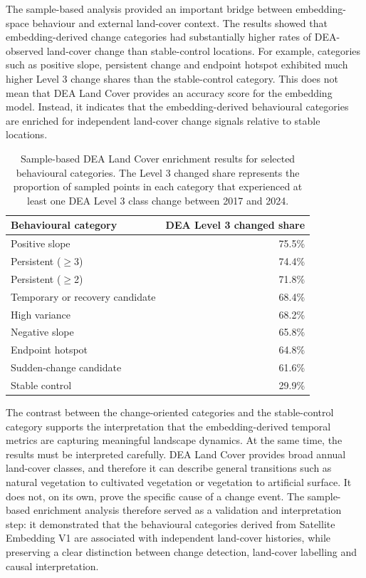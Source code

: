 \documentclass[11pt,a4paper]{article}
\begin{document}
The sample-based analysis provided an important bridge between embedding-space behaviour and external land-cover context. The results showed that embedding-derived change categories had substantially higher rates of DEA-observed land-cover change than stable-control locations. For example, categories such as positive slope, persistent change and endpoint hotspot exhibited much higher Level 3 change shares than the stable-control category. This does not mean that DEA Land Cover provides an accuracy score for the embedding model. Instead, it indicates that the embedding-derived behavioural categories are enriched for independent land-cover change signals relative to stable locations.

\begin{table}[H]
\centering
\caption{Sample-based DEA Land Cover enrichment results for selected behavioural categories. The Level 3 changed share represents the proportion of sampled points in each category that experienced at least one DEA Level 3 class change between 2017 and 2024.}
\label{tab:dea_sample_enrichment}
\renewcommand{\arraystretch}{1.2}
\begin{tabularx}{0.85\textwidth}{>{\raggedright\arraybackslash}X r}
\toprule
\textbf{Behavioural category} & \textbf{DEA Level 3 changed share} \\
\midrule
Positive slope & 75.5\% \\
Persistent ($\geq$3) & 74.4\% \\
Persistent ($\geq$2) & 71.8\% \\
Temporary or recovery candidate & 68.4\% \\
High variance & 68.2\% \\
Negative slope & 65.8\% \\
Endpoint hotspot & 64.8\% \\
Sudden-change candidate & 61.6\% \\
Stable control & 29.9\% \\
\bottomrule
\end{tabularx}
\end{table}

The contrast between the change-oriented categories and the stable-control category supports the interpretation that the embedding-derived temporal metrics are capturing meaningful landscape dynamics. At the same time, the results must be interpreted carefully. DEA Land Cover provides broad annual land-cover classes, and therefore it can describe general transitions such as natural vegetation to cultivated vegetation or vegetation to artificial surface. It does not, on its own, prove the specific cause of a change event. The sample-based enrichment analysis therefore served as a validation and interpretation step: it demonstrated that the behavioural categories derived from Satellite Embedding V1 are associated with independent land-cover histories, while preserving a clear distinction between change detection, land-cover labelling and causal interpretation.
\end{document}
